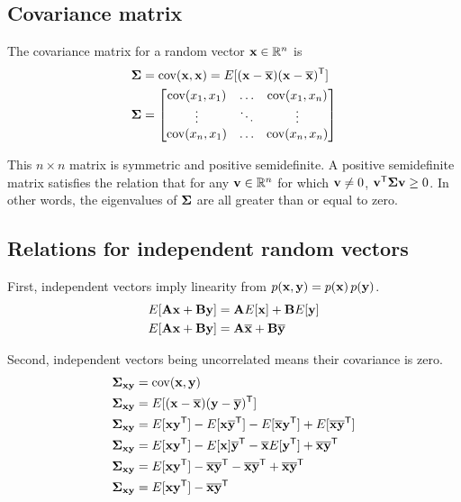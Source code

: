 \subsection{Covariance matrix}

The covariance matrix for a random vector $\mathbf{x} \in \mathbb{R}^n$ is
\begin{align*}
  \mathbf{\Sigma} &= \operatorname{cov}(\mathbf{x}, \mathbf{x}) = E[(\mathbf{x} - \overline{\mathbf{x}})
    (\mathbf{x} - \overline{\mathbf{x}})^\mathsf{T}] \\
  \mathbf{\Sigma} &= \begin{bmatrix}
    \operatorname{cov}(x_1, x_1) & \ldots & \operatorname{cov}(x_1, x_n) \\
    \vdots         & \ddots & \vdots \\
    \operatorname{cov}(x_n, x_1) & \ldots & \operatorname{cov}(x_n, x_n) \\
  \end{bmatrix}
\end{align*}

This $n \times n$ matrix is symmetric and positive semidefinite. A positive
semidefinite matrix satisfies the relation that for any
$\mathbf{v} \in \mathbb{R}^n$ for which $\mathbf{v} \neq 0$,
$\mathbf{v}^\mathsf{T} \mathbf{\Sigma} \mathbf{v} \geq 0$. In other words, the eigenvalues of
$\mathbf{\Sigma}$ are all greater than or equal to zero.

\subsection{Relations for independent random vectors}

First, independent vectors imply linearity from
$p(\mathbf{x}, \mathbf{y}) = p(\mathbf{x}) \,p(\mathbf{y})$.
\begin{align*}
  E[\mathbf{A}\mathbf{x} + \mathbf{B}\mathbf{y}] &= \mathbf{A}E[\mathbf{x}] + \mathbf{B}E[\mathbf{y}] \\
  E[\mathbf{A}\mathbf{x} + \mathbf{B}\mathbf{y}] &= \mathbf{A}\overline{\mathbf{x}} + \mathbf{B}\overline{\mathbf{y}}
\end{align*}

Second, independent vectors being uncorrelated means their covariance is zero.
\begin{align}
  \mathbf{\Sigma}_{\mathbf{x}\mathbf{y}} &= \operatorname{cov}(\mathbf{x}, \mathbf{y}) \nonumber \\
  \mathbf{\Sigma}_{\mathbf{x}\mathbf{y}} &= E[(\mathbf{x} - \overline{\mathbf{x}})
    (\mathbf{y} - \overline{\mathbf{y}})^\mathsf{T}] \nonumber \\
  \mathbf{\Sigma}_{\mathbf{x}\mathbf{y}} &= E[\mathbf{x}\mathbf{y}^\mathsf{T}] -
    E[\mathbf{x}\overline{\mathbf{y}}^\mathsf{T}] - E[\overline{\mathbf{x}}\mathbf{y}^\mathsf{T}] +
    E[\overline{\mathbf{x}}\overline{\mathbf{y}}^\mathsf{T}] \nonumber \\
  \mathbf{\Sigma}_{\mathbf{x}\mathbf{y}} &= E[\mathbf{x}\mathbf{y}^\mathsf{T}] -
    E[\mathbf{x}]\overline{\mathbf{y}}^\mathsf{T} - \overline{\mathbf{x}}E[\mathbf{y}^\mathsf{T}] +
    \overline{\mathbf{x}}\overline{\mathbf{y}}^\mathsf{T} \nonumber \\
  \mathbf{\Sigma}_{\mathbf{x}\mathbf{y}} &= E[\mathbf{x}\mathbf{y}^\mathsf{T}] -
    \overline{\mathbf{x}}\overline{\mathbf{y}}^\mathsf{T} - \overline{\mathbf{x}}\overline{\mathbf{y}}^\mathsf{T} +
    \overline{\mathbf{x}}\overline{\mathbf{y}}^\mathsf{T} \nonumber \\
  \mathbf{\Sigma}_{\mathbf{x}\mathbf{y}} &= E[\mathbf{x}\mathbf{y}^\mathsf{T}] -
    \overline{\mathbf{x}}\overline{\mathbf{y}}^\mathsf{T} \label{eq:prb_sigma}
\end{align}

